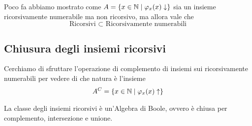 Poco fa abbiamo mostrato come $A = \left\{x \in \mathbb{N} \mid \varphi_x (x) \downarrow\right\}$ sia un insieme ricorsivamente numerabile ma non ricorsivo, ma allora vale che
$$\text{Ricorsivi } \subset \text{ Ricorsivamente numerabili} $$

\subsection{Chiusura degli insiemi ricorsivi}

Cerchiamo di sfruttare l'operazione di complemento di insiemi sui ricorsivamente numerabili per vedere di che natura è l'insieme 
$$ A^C = \left\{x \in \mathbb{N} \mid \varphi_x (x) \uparrow \right\}$$

\begin{theor}
	La classe degli insiemi ricorsivi è un'Algebra di Boole, ovvero è chiusa per complemento, intersezione e unione.
\end{theor}

